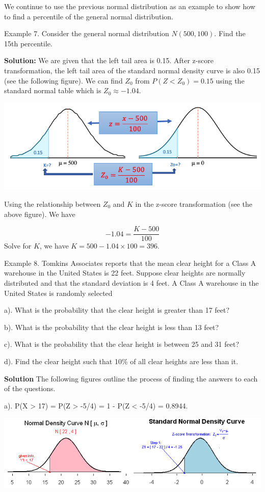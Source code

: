 \documentclass[
]{book}
\begin{document}
We continue to use the previous normal distribution as an example to show how to find a percentile of the general normal distribution.

Example 7. Consider the general normal distribution \(N(500, 100)\). Find the 15th percentile.

\textbf{Solution: } We are given that the left tail area is 0.15. After z-score transformation, the left tail area of the standard normal density curve is also 0.15 (see the following figure). We can find \(Z_0\) from \(P(Z < Z_0) = 0.15\) using the standard normal table which is \(Z_0 \approx -1.04\).

\begin{center}\includegraphics[width=0.6\linewidth]{week04/example07} \end{center}

Using the relationship between \(Z_0\) and \(K\) in the z-score transformation (see the above figure). We have

\[
-1.04 = \frac{K - 500}{100}
\]
Solve for \(K\), we have \(K = 500 - 1.04\times 100 = 396\).

Example 8. Tomkins Associates reports that the mean clear height for a Class A warehouse in the United States is 22 feet. Suppose clear heights are normally distributed and that the standard deviation is 4 feet. A Class A warehouse in the United States is randomly selected

a). What is the probability that the clear height is greater than 17 feet?

b). What is the probability that the clear height is less than 13 feet?

c). What is the probability that the clear height is between 25 and 31 feet?

d). Find the clear height such that 10\% of all clear heights are less than it.

\textbf{Solution} The following figures outline the process of finding the answers to each of the questions.

a). P(X \textgreater{} 17) = P(Z \textgreater{} -5/4) = 1 - P(Z \textless{} -5/4) = 0.8944.

\hfill\break

\begin{center}\includegraphics[width=0.6\linewidth]{week04/example08a} \end{center}
\end{document}
